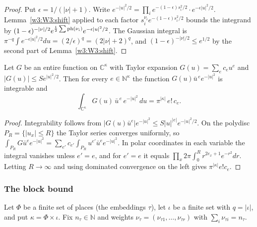 \begin{proof}
Put $\epsilon=1/(\lvert\nu\rvert+1)$. Write $e^{-\lvert u\rvert^2/2}=\prod_ie^{-(1-\epsilon)s_i^2/2}\cdot e^{-\epsilon\lvert u\rvert^2/2}$. Lemma~\ref{w3:W3:shift} applied to each factor $s_i^{\nu_i}e^{-(1-\epsilon)s_i^2/2}$ bounds the integrand by $(1-\epsilon)^{-\lvert\nu\rvert/2}e^{\frac12\sum\operatorname{ph}(\nu_i)}e^{-\epsilon\lvert u\rvert^2/2}$. The Gaussian integral is $\pi^{-q}\int e^{-\epsilon\lvert u\rvert^2/2}du=(2/\epsilon)^q=(2\lvert\nu\rvert+2)^q$, and $(1-\epsilon)^{-\lvert\nu\rvert/2}\le e^{1/2}$ by the second part of Lemma~\ref{w3:W3:shift}.
\end{proof}

\begin{lemma}\label{w3:W3:jet}
Let $G$ be an entire function on $\mathbb C^\kappa$ with Taylor expansion $G(u)=\sum_ec_eu^e$ and $\lvert G(u)\rvert\le Se^{\lvert u\rvert^2/2}$. Then for every $e\in\mathbb N^\kappa$ the function $G(u)\bar u^{\,e}e^{-\lvert u\rvert^2}$ is integrable and
\[
\int_{\mathbb C^\kappa}G(u)\,\bar u^{\,e}\,e^{-\lvert u\rvert^2}\,du=\pi^{\lvert\kappa\rvert}\,e!\,c_e .
\]
\end{lemma}

\begin{proof}
Integrability follows from $\lvert G(u)\bar u^{e}\rvert e^{-\lvert u\rvert^2}\le S\lvert u\rvert^{\lvert e\rvert}e^{-\lvert u\rvert^2/2}$. On the polydisc $P_R=\{\lvert u_x\rvert\le R\}$ the Taylor series converges uniformly, so $\int_{P_R}G\bar u^ee^{-\lvert u\rvert^2}=\sum_{e'}c_{e'}\int_{P_R}u^{e'}\bar u^{e}e^{-\lvert u\rvert^2}$. In polar coordinates in each variable the integral vanishes unless $e'=e$, and for $e'=e$ it equals $\prod_x2\pi\int_0^Rr^{2e_x+1}e^{-r^2}dr$. Letting $R\to\infty$ and using dominated convergence on the left gives $\pi^{\lvert\kappa\rvert}e!c_e$.
\end{proof}

\subsubsection{The block bound}

Let $\Phi$ be a finite set of places (the embeddings $\tau$), let $\iota$ be a finite set with $q=\lvert\iota\rvert$, and put $\kappa=\Phi\times\iota$. Fix $n_\tau\in\mathbb N$ and weights $\nu_\tau=(\nu_{\tau1},\dots,\nu_{\tau r})$ with $\sum_i\nu_{\tau i}=n_\tau$.

